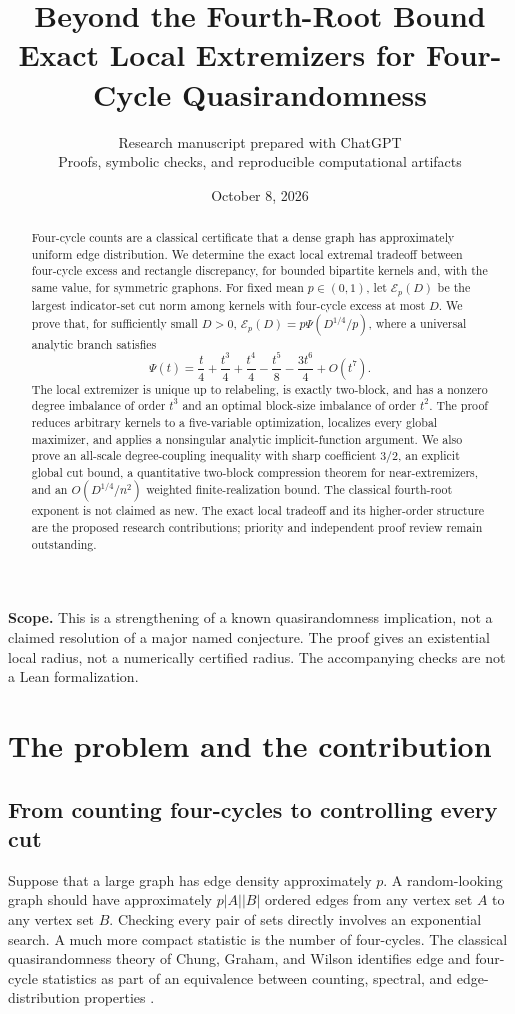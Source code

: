 \documentclass[11pt]{article}
\title{\textbf{Beyond the Fourth-Root Bound}\\[6pt]
\Large Exact Local Extremizers for Four-Cycle Quasirandomness}
\author{Research manuscript prepared with ChatGPT\\
\small Proofs, symbolic checks, and reproducible computational artifacts}
\date{October 8, 2026}
\theoremstyle{definition}
\newcommand{\1}{\mathbf 1}
\newcommand{\calE}{\mathcal E}
\begin{document}
\maketitle
\thispagestyle{empty}
\begin{abstract}
Four-cycle counts are a classical certificate that a dense graph has approximately uniform edge distribution. We determine the exact local extremal tradeoff between four-cycle excess and rectangle discrepancy, for bounded bipartite kernels and, with the same value, for symmetric graphons. For fixed mean $p\in(0,1)$, let $\calE_p(D)$ be the largest indicator-set cut norm among kernels with four-cycle excess at most $D$. We prove that, for sufficiently small $D>0$, $\calE_p(D)=p\Psi(D^{1/4}/p)$, where a universal analytic branch satisfies
\[
\Psi(t)=\frac t4+\frac{t^3}4+\frac{t^4}4-\frac{t^5}8-\frac{3t^6}4+O(t^7).
\]
The local extremizer is unique up to relabeling, is exactly two-block, and has a nonzero degree imbalance of order $t^3$ and an optimal block-size imbalance of order $t^2$. The proof reduces arbitrary kernels to a five-variable optimization, localizes every global maximizer, and applies a nonsingular analytic implicit-function argument. We also prove an all-scale degree-coupling inequality with sharp coefficient $3/2$, an explicit global cut bound, a quantitative two-block compression theorem for near-extremizers, and an $O(D^{1/4}/n^2)$ weighted finite-realization bound. The classical fourth-root exponent is not claimed as new. The exact local tradeoff and its higher-order structure are the proposed research contributions; priority and independent proof review remain outstanding.
\end{abstract}
\vfill
\noindent\textbf{Scope.} This is a strengthening of a known quasirandomness implication, not a claimed resolution of a major named conjecture. The proof gives an existential local radius, not a numerically certified radius. The accompanying checks are not a Lean formalization.
\newpage
{\small\setlength{\parskip}{0pt}\tableofcontents}
\newpage

\section{The problem and the contribution}
\subsection{From counting four-cycles to controlling every cut}
Suppose that a large graph has edge density approximately $p$. A random-looking graph should have approximately $p|A||B|$ ordered edges from any vertex set $A$ to any vertex set $B$. Checking every pair of sets directly involves an exponential search. A much more compact statistic is the number of four-cycles. The classical quasirandomness theory of Chung, Graham, and Wilson identifies edge and four-cycle statistics as part of an equivalence between counting, spectral, and edge-distribution properties \cite{CGW1989}.
\end{document}

